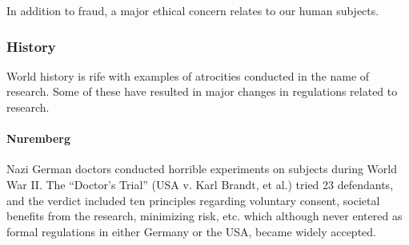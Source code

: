 \documentclass[12pt] {article}
\begin{document}
In addition to fraud, a major ethical concern relates to our human
subjects.

\subsubsection{History}\label{history}

World history is rife with examples of atrocities conducted in the name
of research. Some of these have resulted in major changes in regulations
related to research.

\paragraph{Nuremberg}\label{nuremberg}

Nazi German doctors conducted horrible experiments on subjects during
World War II. The ``Doctor's Trial'' (USA v. Karl Brandt, et al.) tried
23 defendants, and the verdict included ten principles regarding voluntary consent, societal benefits from the research, minimizing risk, etc.
which although never entered as formal regulations in either Germany or
the USA, became widely accepted.


\end{document}
